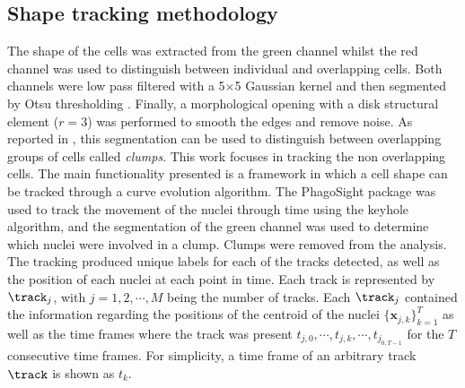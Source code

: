 \subsection{Shape tracking methodology}
The shape of the cells was extracted from the green channel whilst the red
channel was used to distinguish between individual and overlapping cells.
Both channels were low pass filtered
with a 5$\times$5 Gaussian kernel and then segmented by Otsu
thresholding \cite{Otsu1979}.
Finally, a morphological opening with a disk structural element
($r=3$) was performed
to smooth the edges and remove noise. As reported in \cite{solislemus2017},
this segmentation can be used to distinguish between overlapping groups of
cells called \emph{clumps}.
This work focuses in tracking the non overlapping cells.
The main functionality presented is a framework in which a cell
shape can be tracked
through a curve evolution algorithm.
The PhagoSight package  \cite{Henry2013} was used to track the movement
of the nuclei through time using the keyhole algorithm, and the segmentation of
the green channel was used to determine which nuclei were involved in a clump.
Clumps were removed from the analysis.
The tracking produced unique
labels for each of the tracks detected, as well as the
position of each nuclei at each point in time. Each track is represented by
$\track_{j}$, with $j=1,2,\cdots,M$ being the number of tracks.
Each $\track_{j}$ contained the information regarding the
positions of the centroid of the nuclei $\{\mathbf{x}_{j,k}\}_{k=1}^T$ as well as
the time frames where the track was present $t_{j,0}, \cdots, t_{j,k}, \cdots,
t_{j_{0, T-1}}$ for the $T$ consecutive time frames.
For simplicity, a time frame of an arbitrary track $\track$ is shown as $t_k$.


